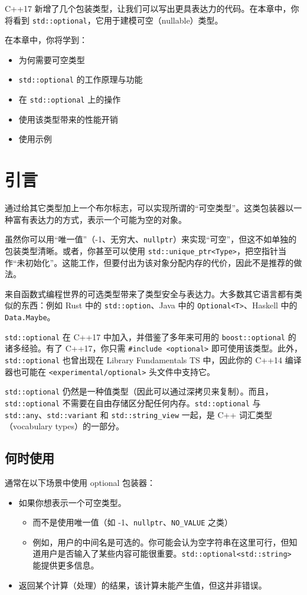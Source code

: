 C++17 新增了几个包装类型，让我们可以写出更具表达力的代码。在本章中，你将看到 \texttt{std::optional}，它用于建模可空（nullable）类型。

在本章中，你将学到：
\begin{itemize}
\item 为何需要可空类型
\item \texttt{std::optional} 的工作原理与功能
\item 在 \texttt{std::optional} 上的操作
\item 使用该类型带来的性能开销
\item 使用示例
\end{itemize}

\section{引言}
通过给其它类型加上一个布尔标志，可以实现所谓的“可空类型”。这类包装器以一种富有表达力的方式，表示一个可能为空的对象。

虽然你可以用“唯一值”（-1、无穷大、\texttt{nullptr}）来实现“可空”，但这不如单独的包装类型清晰。或者，你甚至可以使用 \texttt{std::unique\_ptr<Type>}，把空指针当作“未初始化”。这能工作，但要付出为该对象分配内存的代价，因此不是推荐的做法。

来自函数式编程世界的可选类型带来了类型安全与表达力。大多数其它语言都有类似的东西：例如 Rust 中的 \texttt{std::option}、Java 中的 \texttt{Optional<T>}、Haskell 中的 \texttt{Data.Maybe}。

\texttt{std::optional} 在 C++17 中加入，并借鉴了多年来可用的 \texttt{boost::optional} 的诸多经验。有了 C++17，你只需 \texttt{\#include <optional>} 即可使用该类型。此外，\texttt{std::optional} 也曾出现在 Library Fundamentals TS 中，因此你的 C++14 编译器也可能在 \texttt{<experimental/optional>} 头文件中支持它。

\texttt{std::optional} 仍然是一种值类型（因此可以通过深拷贝来复制）。而且，\texttt{std::optional} 不需要在自由存储区分配任何内存。\texttt{std::optional} 与 \texttt{std::any}、\texttt{std::variant} 和 \texttt{std::string\_view} 一起，是 C++ 词汇类型（vocabulary types）的一部分。

\subsection{何时使用}
通常在以下场景中使用 optional 包装器：
\begin{itemize}
\item 如果你想表示一个可空类型。
\begin{itemize}
\item 而不是使用唯一值（如 -1、\texttt{nullptr}、\texttt{NO\_VALUE} 之类）
\item 例如，用户的中间名是可选的。你可能会认为空字符串在这里可行，但知道用户是否输入了某些内容可能很重要。\texttt{std::optional<std::string>} 能提供更多信息。
\end{itemize}
\item 返回某个计算（处理）的结果，该计算未能产生值，但这并非错误。
\end{itemize}

